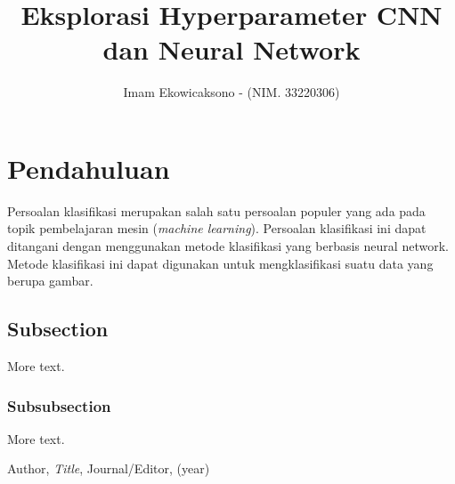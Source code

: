 \documentclass[a4, 12px]{article}
\title{Eksplorasi Hyperparameter CNN dan Neural Network}
\author{Imam Ekowicaksono -
  \small (NIM. 33220306)
}
\date{}
\theoremstyle{definition}
\theoremstyle{remark}
\begin{document}
\maketitle


\section{Pendahuluan}

Persoalan klasifikasi merupakan salah satu persoalan populer yang ada pada topik pembelajaran mesin (\textit{machine learning}). Persoalan klasifikasi ini dapat ditangani dengan menggunakan metode klasifikasi yang berbasis neural network. Metode klasifikasi ini dapat digunakan untuk mengklasifikasi suatu data yang berupa gambar. 

\subsection{Subsection}\label{sec:nothing}

More text.

\subsubsection{Subsubsection}\label{sec:nothing2}

More text.

\begin{thebibliography}{99}

 Author, \emph{Title}, Journal/Editor, (year)

\end{thebibliography}
\end{document}
